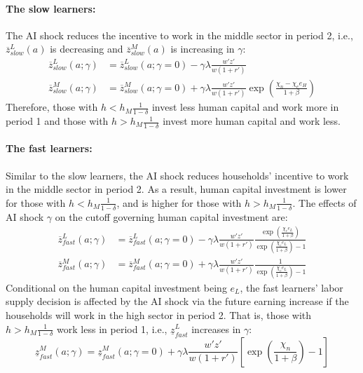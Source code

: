 \documentclass[12pt]{article}
\begin{document}
\paragraph{The slow learners:} The AI shock reduces the incentive to work in the middle sector in period 2, i.e., $\overline{z}^L_{slow}(a)$ is decreasing and $\overline{z}^M_{slow}(a)$ is increasing in $\gamma$:
\begin{align*}
    \overline{z}^L_{slow}(a;\gamma)&= \overline{z}^L_{slow}(a;\gamma=0) - \gamma \lambda  \frac{w'z'}{w(1+r')}\\
    \overline{z}^M_{slow}(a;\gamma)&=\overline{z}^M_{slow}(a;\gamma=0) + \gamma \lambda \frac{w'z'}{w(1+r')}\exp(\frac{\chi_n-\chi_e e_H}{1+\beta})
\end{align*}
Therefore, those with $h<h_M\frac{1}{1-\delta}$ invest less human capital and work more in period 1 and those with $h>h_M\frac{1}{1-\delta}$ invest more human capital and work less.

\paragraph{The fast learners:} Similar to the slow learners, the AI shock reduces households' incentive to work in the middle sector in period 2. As a result, human capital investment is lower for those with $h<h_M\frac{1}{1-\delta}$, and is higher for those with $h>h_M\frac{1}{1-\delta}$. The effects of AI shock $\gamma$ on the cutoff governing human capital investment are:
\begin{align*}
    \overline{z}^L_{fast}(a;\gamma)&= \overline{z}^L_{fast}(a;\gamma=0) - \gamma \lambda \frac{w'z'}{w(1+r')}\frac{\exp(\frac{\chi_e e_L}{1+\beta})}{\exp(\frac{\chi_e e_L}{1+\beta})-1} \\
    \overline{z}^M_{fast}(a;\gamma)&= \overline{z}^M_{fast}(a;\gamma=0) + \gamma \lambda \frac{w'z'}{w(1+r')}\frac{1}{\exp(\frac{\chi_e e_L}{1+\beta})-1} 
\end{align*}
Conditional on the human capital investment being $e_L$, the fast learners' labor supply decision is affected by the AI shock via the future earning increase if the households will work in the high sector in period 2. That is, those with $h>h_M\frac{1}{1-\delta}$ work less in period 1, i.e., $\underline{z}^L_{fast}$ increases in $\gamma$:
\begin{equation*}
    \underline{z}^M_{fast}(a;\gamma)=\underline{z}^M_{fast}(a;\gamma=0) + \gamma \lambda \frac{w'z'}{w(1+r')}\left[\exp(\frac{\chi_n}{1+\beta})-1\right]
\end{equation*}
\end{document}
